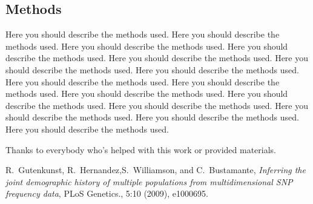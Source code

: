 \documentclass{pnastwo}
\begin{document}
\begin{article}
\begin{materials}
\subsection{Methods}
Here you should describe the methods used. Here you should describe the methods used. Here you should describe the methods used. Here you should describe the methods used. Here you should describe the methods used. Here you should describe the methods used. Here you should describe the methods used. Here you should describe the methods used. Here you should describe the methods used. Here you should describe the methods used. Here you should describe the methods used. Here you should describe the methods used. Here you should describe the methods used. Here you should describe the methods used. Here you should describe the methods used. 
\end{materials}

\begin{acknowledgments}
Thanks to everybody who's helped with this work or provided materials.
\end{acknowledgments}


\begin{thebibliography}{10}
R.~Gutenkunst, R.~Hernandez,S.~Williamson, and C.~Bustamante, {\em
  Inferring the joint demographic history of multiple populations from
  multidimensional SNP frequency data}, PLoS Genetics., 5:10 (2009), e1000695.
\end{thebibliography}

\end{article}
\end{document}
